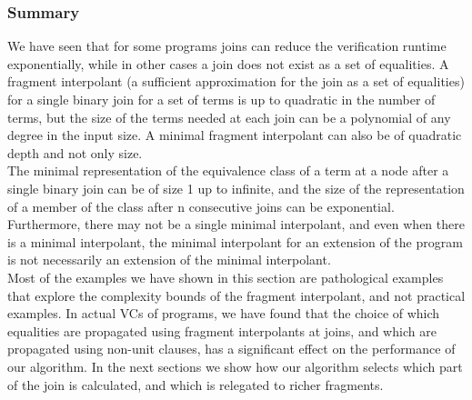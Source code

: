 \subsubsection*{Summary}
We have seen that for some programs joins can reduce the verification runtime exponentially, while in other cases a join does not exist as a set of equalities. A fragment interpolant (a sufficient approximation for the join as a set of equalities) for a single binary join for a set of terms is up to quadratic in the number of terms, but the size of the terms needed at each join can be a polynomial of any degree in the input size. A minimal fragment interpolant can also be of quadratic depth and not only size.\\
The minimal representation of the equivalence class of a term at a node after a single binary join can be of size 1 up to infinite, and the size of the representation of a member of the class after n consecutive joins can be exponential.\\
Furthermore, there may not be a single minimal interpolant, and even when there is a minimal interpolant, 
the minimal interpolant for an extension of the program is not necessarily an extension of the minimal interpolant.\\
Most of the examples we have shown in this section are pathological examples that explore the complexity bounds of the fragment interpolant, and not practical examples. In actual VCs of programs, we have found that the choice of which equalities are propagated using fragment interpolants at joins, and which are propagated using non-unit clauses, has a significant effect on the performance of our algorithm. In the next sections we show how our algorithm selects which part of the join is calculated, and which is relegated to richer fragments.